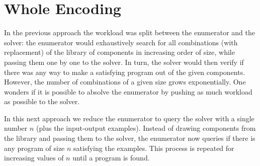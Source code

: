 \section{Whole Encoding}
\label{sec:whole-encoding}

In the previous approach the workload was split between the enumerator and the
solver: the enumerator would exhaustively search for all combinations (with
replacement) of the library of components in increasing order of size, while
passing them one by one to the solver. In turn, the solver would then verify if
there was any way to make a satisfying program out of the given components.
However, the number of combinations of a given size grows exponentially. One
wonders if it is possible to absolve the enumerator by pushing as much workload
as possible to the solver.

In this next approach we reduce the enumerator to query the solver with a single
number $n$ (plus the input-output examples). Instead of drawing components from the
library and passing them to the solver, the enumerator now queries if there is 
any program of size $n$ satisfying the examples. This process is repeated for
increasing values of $n$ until a program is found.

